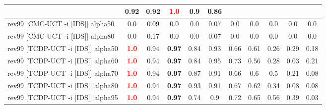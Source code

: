 \documentclass{article}
\begin{document}
\begin{tabular}{|l|r@{$\pm$}rr@{$\pm$}rr@{$\pm$}rr@{$\pm$}rr@{$\pm$}rr@{$\pm$}rr@{$\pm$}rr@{$\pm$}rr@{$\pm$}rr@{$\pm$}r|}
& \multicolumn{2}{c}{0.92}
& \multicolumn{2}{c}{0.92}
& \multicolumn{2}{c}{\textbf{\textcolor{red}{1.0}}}
& \multicolumn{2}{c}{0.9}
& \multicolumn{2}{c|}{0.86}
\\
\hline
rev99 [CMC-UCT -i [IDS]] alpha50
& \multicolumn{2}{c}{0.0}
& \multicolumn{2}{c}{0.09}
& \multicolumn{2}{c}{0.0}
& \multicolumn{2}{c}{0.0}
& \multicolumn{2}{c}{0.07}
& \multicolumn{2}{c}{0.0}
& \multicolumn{2}{c}{0.0}
& \multicolumn{2}{c}{0.0}
& \multicolumn{2}{c}{0.0}
& \multicolumn{2}{c|}{0.0}
\\
rev99 [CMC-UCT -i [IDS]] alpha80
& \multicolumn{2}{c}{0.0}
& \multicolumn{2}{c}{0.17}
& \multicolumn{2}{c}{0.0}
& \multicolumn{2}{c}{0.0}
& \multicolumn{2}{c}{0.07}
& \multicolumn{2}{c}{0.0}
& \multicolumn{2}{c}{0.0}
& \multicolumn{2}{c}{0.0}
& \multicolumn{2}{c}{0.0}
& \multicolumn{2}{c|}{0.0}
\\
rev99 [TCDP-UCT -i [IDS]] alpha50
& \multicolumn{2}{c}{\textbf{\textcolor{red}{1.0}}}
& \multicolumn{2}{c}{0.94}
& \multicolumn{2}{c}{\textbf{0.97}}
& \multicolumn{2}{c}{0.84}
& \multicolumn{2}{c}{0.93}
& \multicolumn{2}{c}{0.66}
& \multicolumn{2}{c}{0.61}
& \multicolumn{2}{c}{0.26}
& \multicolumn{2}{c}{0.29}
& \multicolumn{2}{c|}{0.18}
\\
rev99 [TCDP-UCT -i [IDS]] alpha60
& \multicolumn{2}{c}{\textbf{\textcolor{red}{1.0}}}
& \multicolumn{2}{c}{0.94}
& \multicolumn{2}{c}{\textbf{0.97}}
& \multicolumn{2}{c}{0.84}
& \multicolumn{2}{c}{0.95}
& \multicolumn{2}{c}{0.73}
& \multicolumn{2}{c}{0.56}
& \multicolumn{2}{c}{0.28}
& \multicolumn{2}{c}{0.03}
& \multicolumn{2}{c|}{0.21}
\\
rev99 [TCDP-UCT -i [IDS]] alpha70
& \multicolumn{2}{c}{\textbf{\textcolor{red}{1.0}}}
& \multicolumn{2}{c}{0.94}
& \multicolumn{2}{c}{\textbf{0.97}}
& \multicolumn{2}{c}{0.87}
& \multicolumn{2}{c}{0.91}
& \multicolumn{2}{c}{0.66}
& \multicolumn{2}{c}{0.6}
& \multicolumn{2}{c}{0.5}
& \multicolumn{2}{c}{0.21}
& \multicolumn{2}{c|}{0.08}
\\
rev99 [TCDP-UCT -i [IDS]] alpha80
& \multicolumn{2}{c}{\textbf{\textcolor{red}{1.0}}}
& \multicolumn{2}{c}{0.94}
& \multicolumn{2}{c}{\textbf{0.97}}
& \multicolumn{2}{c}{0.93}
& \multicolumn{2}{c}{0.91}
& \multicolumn{2}{c}{0.67}
& \multicolumn{2}{c}{0.62}
& \multicolumn{2}{c}{0.34}
& \multicolumn{2}{c}{0.08}
& \multicolumn{2}{c|}{0.08}
\\
rev99 [TCDP-UCT -i [IDS]] alpha95
& \multicolumn{2}{c}{\textbf{\textcolor{red}{1.0}}}
& \multicolumn{2}{c}{0.94}
& \multicolumn{2}{c}{\textbf{0.97}}
& \multicolumn{2}{c}{0.74}
& \multicolumn{2}{c}{0.9}
& \multicolumn{2}{c}{0.72}
& \multicolumn{2}{c}{0.65}
& \multicolumn{2}{c}{0.56}
& \multicolumn{2}{c}{0.39}
& \multicolumn{2}{c|}{0.03}
\\
\hline
\end{tabular}%
\end{document}
